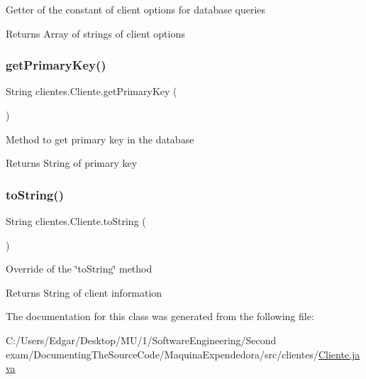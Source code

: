 Getter of the constant of client options for database queries

\begin{DoxyReturn}{Returns}
Array of strings of client options 
\end{DoxyReturn}
\mbox{\label{classclientes_1_1_cliente_afe1b2756b16dc23224805400ef1125d3}} 
\subsubsection{\texorpdfstring{get\+Primary\+Key()}{getPrimaryKey()}}
{\footnotesize\ttfamily String clientes.\+Cliente.\+get\+Primary\+Key (\begin{DoxyParamCaption}{ }\end{DoxyParamCaption})\hspace{0.3cm}{\ttfamily [inline]}}

Method to get primary key in the database

\begin{DoxyReturn}{Returns}
String of primary key 
\end{DoxyReturn}
\mbox{\label{classclientes_1_1_cliente_a1bcd093234a348d3471ab95a1c58fa8c}} 
\subsubsection{\texorpdfstring{to\+String()}{toString()}}
{\footnotesize\ttfamily String clientes.\+Cliente.\+to\+String (\begin{DoxyParamCaption}{ }\end{DoxyParamCaption})\hspace{0.3cm}{\ttfamily [inline]}}

Override of the \char`\"{}to\+String\char`\"{} method \begin{DoxyReturn}{Returns}
String of client information 
\end{DoxyReturn}


The documentation for this class was generated from the following file\+:\begin{DoxyCompactItemize}
\item 
C\+:/\+Users/\+Edgar/\+Desktop/\+M\+U/1/\+Software\+Engineering/\+Second exam/\+Documenting\+The\+Source\+Code/\+Maquina\+Expendedora/src/clientes/\mbox{\hyperlink{_cliente_8java}{Cliente.\+java}}\end{DoxyCompactItemize}
